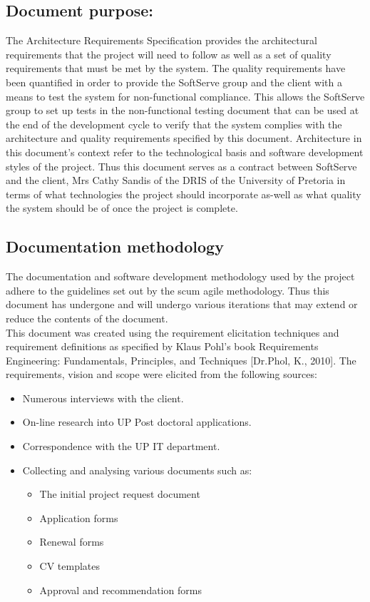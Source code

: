 \documentclass[12pt]{article}
\begin{document}
\subsection{Document purpose:}
\vspace{0.2in}
The Architecture Requirements Specification provides the architectural requirements that the project will need to follow as well as a set of quality requirements that must be met by the system. The quality requirements have been quantified in order to provide the SoftServe group and the client with a means to test the system for non-functional compliance. This allows the SoftServe group to set up tests in the non-functional testing document that can be used at the end of the development cycle to verify that the system complies with the architecture and quality requirements specified by this document. Architecture in this document's context refer to the technological basis and software development styles of the project. Thus this document serves as a contract between SoftServe and the client, Mrs Cathy Sandis of the DRIS of the University of Pretoria in terms of what technologies the project should incorporate as-well as what quality the system should be of once the project is complete.

\vspace{0.2in}

\subsection{Documentation methodology}
\vspace{0.2in}
\begin{flushleft}
The documentation and software development methodology used by the project adhere to the guidelines set out by the scum agile methodology. Thus this document has undergone and will undergo various iterations that may extend or reduce the contents of the document.\\

This document was created using the requirement elicitation techniques and requirement definitions as specified by Klaus Pohl’s book Requirements Engineering: Fundamentals, Principles, and Techniques [Dr.Phol, K., 2010].
The requirements, vision and scope were elicited from the following sources:
\begin{itemize}
	\item Numerous interviews with the client.
	\item On-line research into UP Post doctoral applications.
	\item Correspondence with the UP IT department.
	\item Collecting and analysing various documents such as:
		\begin{itemize}
			\item The initial project request document
			\item Application forms
			\item Renewal forms
			\item CV templates
			\item Approval and recommendation forms
		\end{itemize}
\end{itemize}
\end{flushleft}	
\end{document}
